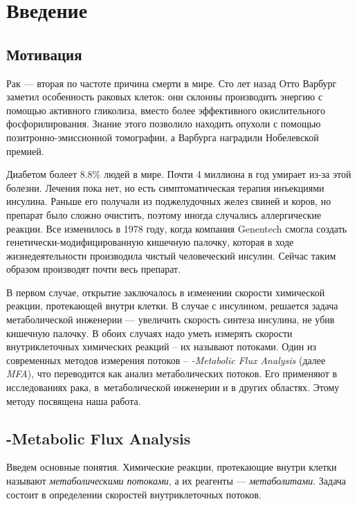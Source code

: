 \documentclass[a4paper, 12pt, left=30mm, right=15mm, top=20mm, bottom=20mm]{report}
\begin{document}
\tableofcontents

\chapter{Введение}
\section{Мотивация}
Рак --- вторая по частоте причина смерти в мире\cite{Cancer_statistics}. Сто лет назад Отто Варбург заметил\cite{Warburg_effect} особенность раковых клеток: они склонны производить энергию с помощью активного гликолиза, вместо более эффективного окислительного фосфорилирования. Знание этого позволило находить опухоли с помощью позитронно-эмиссионной томографии, а Варбурга наградили Нобелевской премией.

Диабетом болеет 8.8\% людей в мире\cite{Diabetes_statistics}. Почти 4 миллиона в год умирает из-за этой болезни. Лечения пока нет, но есть симптоматическая терапия инъекциями инсулина. Раньше его получали из поджелудочных желез свиней и коров, но препарат было сложно очистить, поэтому иногда случались аллергические реакции. Все изменилось в 1978 году, когда компания Genentech смогла создать генетически-модифицированную кишечную палочку, которая в ходе жизнедеятельности производила чистый человеческий инсулин\cite{Genentech_paper}. Сейчас таким образом производят почти весь препарат.

В первом случае, открытие заключалось в изменении скорости химической реакции, протекающей внутри клетки. В случае с инсулином, решается задача метаболической инженерии --- увеличить скорость синтеза инсулина, не убив кишечную палочку. В обоих случаях надо уметь измерять скорости внутриклеточных химических реакций -- их называют потоками. Один из современных методов измерения потоков -- \emph{-Metabolic Flux Analysis} (далее \emph{MFA}), что переводится как анализ метаболических потоков. Его применяют в исследованиях рака\cite{Application_cancer_2009, Application_cancer_2012, Application_cancer_2013, Application_cancer_2015, Application_cancer_2017, Application_cancer_2018, Application_cancer_2018_2}, в~метаболической инженерии\cite{Application_engeneering_2009, Application_engeneering_2015, Application_engeneering_2017} и в других областях\cite{Application_other_2011, Application_other_2013, Application_other_2014}. Этому методу посвящена наша работа.

\section{-Metabolic Flux Analysis}
Введем основные понятия. Химические реакции, протекающие внутри клетки называют \emph{метаболическими потоками}, а их реагенты --- \emph{метаболитами}. Задача состоит в определении скоростей внутриклеточных потоков. 
\end{document}
